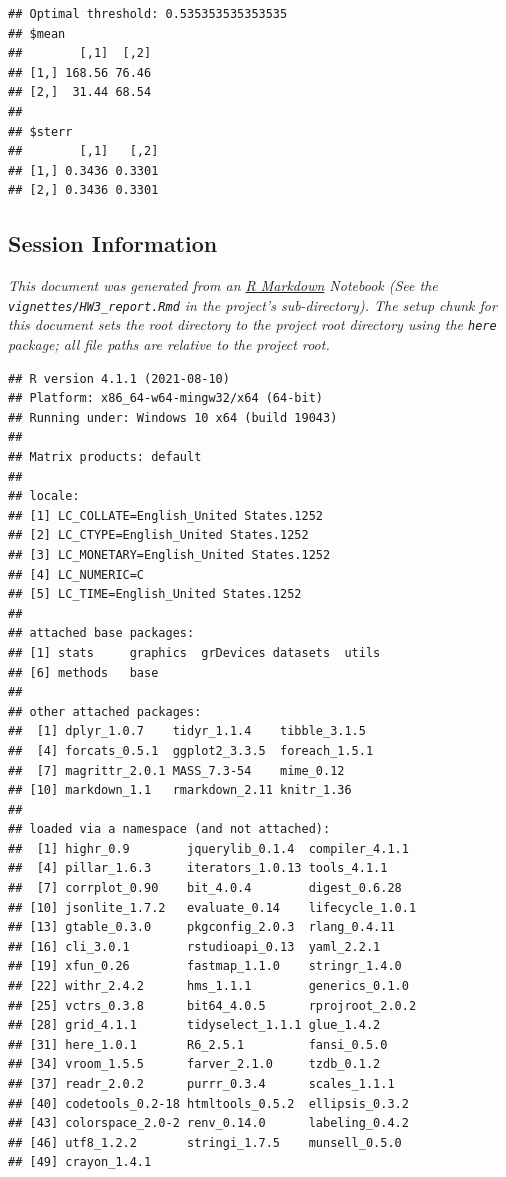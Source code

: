 \documentclass[
  11pt,
  a4paper,
]{scrartcl}
\begin{document}
\begin{verbatim}
## Optimal threshold: 0.535353535353535
## $mean
##        [,1]  [,2]
## [1,] 168.56 76.46
## [2,]  31.44 68.54
## 
## $sterr
##        [,1]   [,2]
## [1,] 0.3436 0.3301
## [2,] 0.3436 0.3301
\end{verbatim}

\newpage

\hypertarget{session-information}{%
\subsection{Session Information}\label{session-information}}

\emph{This document was generated from an
\href{http://rmarkdown.rstudio.com}{R Markdown} Notebook (See the
\texttt{vignettes/HW3\_report.Rmd} in the project's sub-directory). The
setup chunk for this document sets the root directory to the project
root directory using the \texttt{here} package; all file paths are
relative to the project root.}

\begin{verbatim}
## R version 4.1.1 (2021-08-10)
## Platform: x86_64-w64-mingw32/x64 (64-bit)
## Running under: Windows 10 x64 (build 19043)
## 
## Matrix products: default
## 
## locale:
## [1] LC_COLLATE=English_United States.1252 
## [2] LC_CTYPE=English_United States.1252   
## [3] LC_MONETARY=English_United States.1252
## [4] LC_NUMERIC=C                          
## [5] LC_TIME=English_United States.1252    
## 
## attached base packages:
## [1] stats     graphics  grDevices datasets  utils    
## [6] methods   base     
## 
## other attached packages:
##  [1] dplyr_1.0.7    tidyr_1.1.4    tibble_3.1.5  
##  [4] forcats_0.5.1  ggplot2_3.3.5  foreach_1.5.1 
##  [7] magrittr_2.0.1 MASS_7.3-54    mime_0.12     
## [10] markdown_1.1   rmarkdown_2.11 knitr_1.36    
## 
## loaded via a namespace (and not attached):
##  [1] highr_0.9        jquerylib_0.1.4  compiler_4.1.1  
##  [4] pillar_1.6.3     iterators_1.0.13 tools_4.1.1     
##  [7] corrplot_0.90    bit_4.0.4        digest_0.6.28   
## [10] jsonlite_1.7.2   evaluate_0.14    lifecycle_1.0.1 
## [13] gtable_0.3.0     pkgconfig_2.0.3  rlang_0.4.11    
## [16] cli_3.0.1        rstudioapi_0.13  yaml_2.2.1      
## [19] xfun_0.26        fastmap_1.1.0    stringr_1.4.0   
## [22] withr_2.4.2      hms_1.1.1        generics_0.1.0  
## [25] vctrs_0.3.8      bit64_4.0.5      rprojroot_2.0.2 
## [28] grid_4.1.1       tidyselect_1.1.1 glue_1.4.2      
## [31] here_1.0.1       R6_2.5.1         fansi_0.5.0     
## [34] vroom_1.5.5      farver_2.1.0     tzdb_0.1.2      
## [37] readr_2.0.2      purrr_0.3.4      scales_1.1.1    
## [40] codetools_0.2-18 htmltools_0.5.2  ellipsis_0.3.2  
## [43] colorspace_2.0-2 renv_0.14.0      labeling_0.4.2  
## [46] utf8_1.2.2       stringi_1.7.5    munsell_0.5.0   
## [49] crayon_1.4.1
\end{verbatim}
\end{document}
